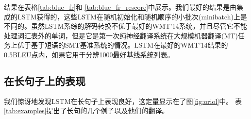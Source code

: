 结果在表格\ref{tab:blue_fr}和
\ref{tab:blue_fr_rescore}中展示。我们最好的结果是由集成的LSTM获得的，这些LSTM在随机初始化和随机顺序的小批次(minibatch)上是不同的。虽然LSTM系综的解码转换不优于最好的WMT'14系统，并且尽管它不能处理词汇表外的单词，但是它是第一次纯神经翻译系统在大规模机器翻译(MT)任务上优于基于短语的SMT基准系统的情况。LSTM在最好的WMT'14结果的0.5BLEU点内，如果它用于分辨1000最好基线系统列表。


\subsection{在长句子上的表现}
\label{sec:long_sentences}

我们惊讶地发现LSTM在长句子上表现良好，这定量显示在了图\ref{fig:oriol}中。
表\ref{tab:examples}提出了长句的几个例子以及他们的翻译。


